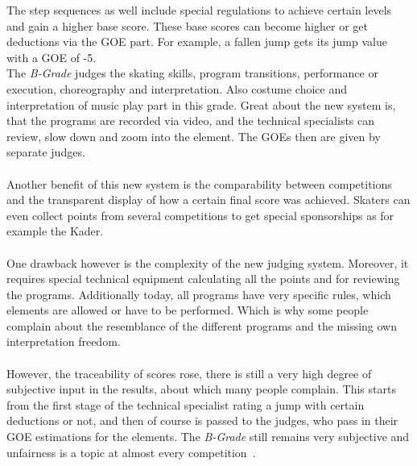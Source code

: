 The step sequences as well include special regulations to achieve certain levels and gain a higher base score.
These base scores can become higher or get deductions via the GOE part.
For example, a fallen jump gets its jump value with a GOE of -5.\\
The \textit{B-Grade} judges the skating skills, program transitions, performance or execution, choreography and
interpretation.
Also costume choice and interpretation of music play part in this grade.
Great about the new system is, that the programs are recorded via video, and the technical specialists can review,
slow down
and zoom into the element.
The GOEs then are given by separate judges.
\\\mbox{}\\
Another benefit of this new system is the comparability between competitions and the transparent display of how a
certain final
score was achieved.
Skaters can even collect points from several competitions to get special sponsorships as for example the Kader.
\\\mbox{}\\
One drawback however is the complexity of the new judging system.
Moreover, it requires special technical equipment calculating all the points and for reviewing the programs.
Additionally today, all programs have very specific rules, which elements are allowed or have to be performed.
Which is why some people complain about the resemblance of the different programs and the missing own interpretation
freedom.
\\\mbox{}\\
However, the traceability of scores rose, there is still a very high degree of subjective input in the results,
about which many people complain.
This starts from the first stage of the technical specialist rating a jump with certain deductions or not, and then
of course
is passed to the judges, who pass in their GOE estimations for the elements.
The \textit{B-Grade} still remains very subjective and unfairness is a topic at almost every
competition~\cite{unfairjudge, isujudginssystem, isuguideleinesgoe}.
